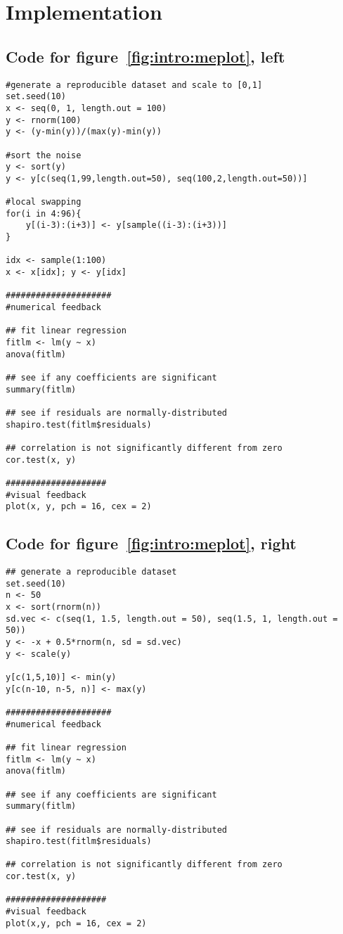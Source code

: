\chapter{Implementation\label{ch:implementation}}

\lstset{basicstyle=\ttfamily\footnotesize,xleftmargin=0cm,breaklines=true,language=R}

\section{Code for figure~\ref{fig:intro:meplot}, left}
\label{sec:appendicies:me1plot}
{
\begin{lstlisting}
#generate a reproducible dataset and scale to [0,1]
set.seed(10)
x <- seq(0, 1, length.out = 100)
y <- rnorm(100)
y <- (y-min(y))/(max(y)-min(y))

#sort the noise
y <- sort(y)
y <- y[c(seq(1,99,length.out=50), seq(100,2,length.out=50))]

#local swapping
for(i in 4:96){
	y[(i-3):(i+3)] <- y[sample((i-3):(i+3))]
}

idx <- sample(1:100)
x <- x[idx]; y <- y[idx]

#####################
#numerical feedback

## fit linear regression
fitlm <- lm(y ~ x)
anova(fitlm)

## see if any coefficients are significant
summary(fitlm)

## see if residuals are normally-distributed
shapiro.test(fitlm$residuals)

## correlation is not significantly different from zero
cor.test(x, y)

####################
#visual feedback
plot(x, y, pch = 16, cex = 2)
\end{lstlisting}
}


\section{Code for figure~\ref{fig:intro:meplot}, right}
\label{sec:appendicies:me2plot}
{
\begin{lstlisting}
## generate a reproducible dataset
set.seed(10)
n <- 50
x <- sort(rnorm(n))
sd.vec <- c(seq(1, 1.5, length.out = 50), seq(1.5, 1, length.out = 50))
y <- -x + 0.5*rnorm(n, sd = sd.vec)
y <- scale(y)

y[c(1,5,10)] <- min(y)
y[c(n-10, n-5, n)] <- max(y)

#####################
#numerical feedback

## fit linear regression
fitlm <- lm(y ~ x)
anova(fitlm)

## see if any coefficients are significant
summary(fitlm)

## see if residuals are normally-distributed
shapiro.test(fitlm$residuals) 

## correlation is not significantly different from zero
cor.test(x, y)

####################
#visual feedback
plot(x,y, pch = 16, cex = 2)
\end{lstlisting}
}


